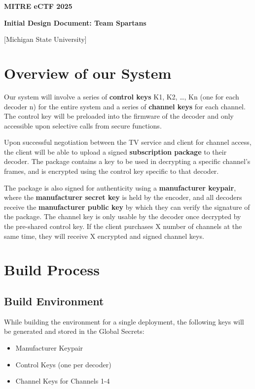 \documentclass[12pt]{article}
\begin{document}
{\centering
\Huge\textbf{MITRE eCTF 2025}

\vspace{1cm}
\Large\textbf{Initial Design Document: Team Spartans}

\vspace{0.5cm}
\Large [Michigan State University]

\vspace{2cm}
}

\section*{Overview of our System}

Our system will involve a series of \textbf{control keys} K1, K2, \ldots, Kn (one for each decoder n) for the entire system and a series of \textbf{channel keys} for each channel. The control key will be preloaded into the firmware of the decoder and only accessible upon selective calls from secure functions. 

Upon successful negotiation between the TV service and client for channel access, the client will be able to upload a signed \textbf{subscription package} to their decoder. The package contains a key to be used in decrypting a specific channel's frames, and is encrypted using the control key specific to that decoder. 

The package is also signed for authenticity using a \textbf{manufacturer keypair}, where the \textbf{manufacturer secret key} is held by the encoder, and all decoders receive the \textbf{manufacturer public key} by which they can verify the signature of the package. The channel key is only usable by the decoder once decrypted by the pre-shared control key. If the client purchases X number of channels at the same time, they will receive X encrypted and signed channel keys.

\newpage
\section*{Build Process}

\subsection*{Build Environment}
While building the environment for a single deployment, the following keys will be generated and stored in the Global Secrets:
\begin{itemize}
  \item Manufacturer Keypair
  \item Control Keys (one per decoder)
  \item Channel Keys for Channels 1-4
\end{itemize}
\end{document}
